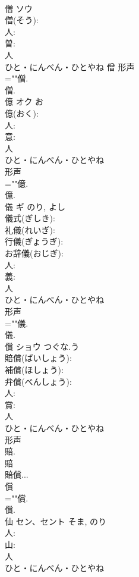 \documentclass[8pt]{extreport}
\begin{document}
\begin{CJK}{UTF8}{min}
\\	僧	ソウ			
\\	僧(そう): 
\\	人: 
\\	曽: 
\\	人	
\\	ひと・にんべん・ひとやね	僧	形声 
\\	=""僧.
\\	僧.
\\	億	オク		お	
\\	億(おく): 
\\	人: 
\\	意: 
\\	人	
\\	ひと・にんべん・ひとやね	
\\	形声 
\\	=""億.
\\	億.
\\	儀	ギ		のり, よし	
\\	儀式(ぎしき): 
\\	礼儀(れいぎ): 
\\	行儀(ぎょうぎ): 
\\	お辞儀(おじぎ): 
\\	人: 
\\	義: 
\\	人	
\\	ひと・にんべん・ひとやね	
\\	形声 
\\	=""儀.
\\	儀.
\\	償	ショウ	つぐな.う		
\\	賠償(ばいしょう): 
\\	補償(ほしょう): 
\\	弁償(べんしょう): 
\\	人: 
\\	賞: 
\\	人	
\\	ひと・にんべん・ひとやね	
\\	形声 
\\	賠. 
\\	賠 
\\	賠償... 
\\	償 
\\	=""償.
\\	償.
\\	仙	セン、セント		そま, のり	
\\	人: 
\\	山: 
\\	人	
\\	ひと・にんべん・ひとやね	

\end{CJK}
\end{document}
